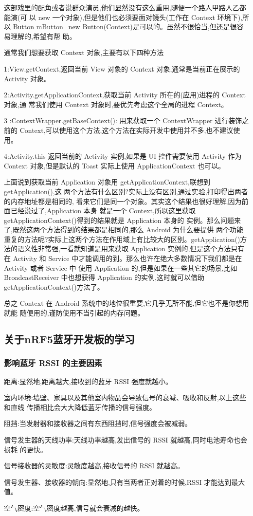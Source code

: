 \documentclass[UTF8]{ctexart}
\begin{document}
这部戏里的配角或者说群众演员,他们显然没有这么重用,随便一个路人甲路人乙都能演(可
以 new 一个对象),但是他们也必须要面对镜头(工作在 Context 环境下),所以 Button
mButton=new Button(Context)是可以的。虽然不很恰当,但还是很容易理解的,希望有帮
助。
\par
通常我们想要获取 Context 对象,主要有以下四种方法
\par
1:View.getContext,返回当前 View 对象的 Context 对象,通常是当前正在展示的 Activity
对象。\par
2:Activity.getApplicationContext,获取当前 Activity 所在的(应用)进程的 Context 对象,通
常我们使用 Context 对象时,要优先考虑这个全局的进程 Context。\par
3 :ContextWrapper.getBaseContext(): 用来获取一个 ContextWrapper 进行装饰之前的
Context,可以使用这个方法,这个方法在实际开发中使用并不多,也不建议使用。\par
4:Activity.this 返回当前的 Activity 实例,如果是 UI 控件需要使用 Activity 作为 Context
对象,但是默认的 Toast 实际上使用 ApplicationContext 也可以。\par
上面说到获取当前 Application 对象用 getApplicationContext,联想到 getApplication(),这
两个方法有什么区别?实际上没有区别,通过实验,打印得出两者的内存地址都是相同的,
看来它们是同一个对象。其实这个结果也很好理解,因为前面已经说过了,Application 本身
就是一个 Context,所以这里获取 getApplicationContext()得到的结果就是 Application 本身的
实例。那么问题来了,既然这两个方法得到的结果都是相同的,那么 Android 为什么要提供
两个功能重复的方法呢?实际上这两个方法在作用域上有比较大的区别。getApplication()方
法的语义性非常强,一看就知道是用来获取 Application 实例的,但是这个方法只有在 Activity
和 Service 中才能调用的到。那么也许在绝大多数情况下我们都是在 Activity 或者 Service 中
使用 Application 的,但是如果在一些其它的场景,比如 BroadcastReceiver 中也想获得
Application 的实例,这时就可以借助 getApplicationContext()方法了。
\par
总之 Context 在 Android 系统中的地位很重要,它几乎无所不能,但它也不是你想用就能
随便用的,谨防使用不当引起的内存问题。
\subsection{关于nRF5蓝牙开发板的学习}
\subsubsection{影响蓝牙 RSSI 的主要因素}
距离:显然地,距离越大,接收到的蓝牙 RSSI 强度就越小。\par
室内环境:墙壁、家具以及其他室内物品会导致信号的衰减、吸收和反射,以上这些和直线
传播相比会大大降低蓝牙传播的信号强度。\par
阻挡:当发射器和接收器之间有东西阻挡时,信号强度会被减弱。\par
信号发生器的天线功率:天线功率越高,发出信号的 RSSI 就越高,同时电池寿命也会损耗
的更快。\par
信号接收器的灵敏度:灵敏度越高,接收信号的 RSSI 就越高。\par
信号发生器、接收器的朝向:显然地,只有当两者正对着的时候,RSSI 才能达到最大值。\par
空气密度:空气密度越高,信号就会衰减的越快。
\end{document}
